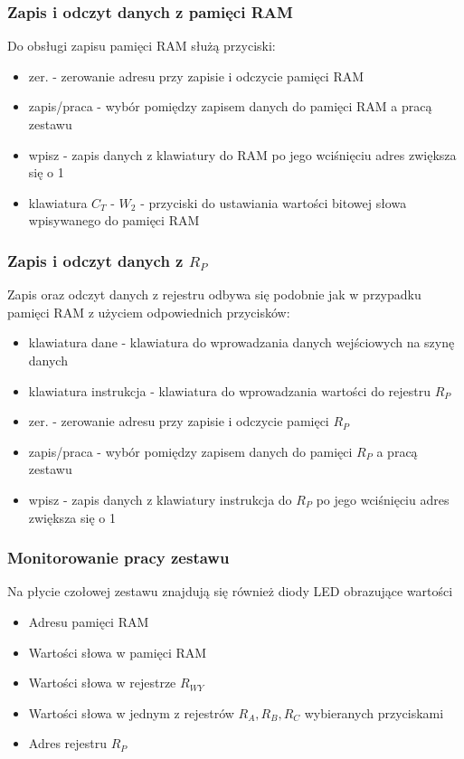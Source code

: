 \documentclass[../main.tex]{subfiles}
\begin{document}
    \subsubsection*{Zapis i odczyt danych z pamięci RAM}
    Do obsługi zapisu pamięci RAM służą przyciski:
    \begin{itemize}
        \item zer. - zerowanie adresu przy zapisie i odczycie pamięci RAM
        \item zapis/praca - wybór pomiędzy zapisem danych do pamięci RAM a pracą zestawu
        \item wpisz - zapis danych z klawiatury do RAM po jego wciśnięciu adres zwiększa się o 1
        \item klawiatura $C_T$ - $W_2$ - przyciski do ustawiania wartości bitowej słowa wpisywanego do pamięci RAM
    \end{itemize}

    \subsubsection*{Zapis i odczyt danych z $R_P$}
    Zapis oraz odczyt danych z rejestru odbywa się podobnie jak w przypadku pamięci RAM z użyciem odpowiednich przycisków:
    \begin{itemize}
        \item klawiatura dane - klawiatura do wprowadzania danych wejściowych na szynę danych
        \item klawiatura instrukcja - klawiatura do wprowadzania wartości do rejestru $R_P$
        \item zer. - zerowanie adresu przy zapisie i odczycie pamięci $R_P$
        \item zapis/praca - wybór pomiędzy zapisem danych do pamięci $R_P$ a pracą zestawu
        \item wpisz - zapis danych z klawiatury instrukcja do $R_P$ po jego wciśnięciu adres zwiększa się o 1
    \end{itemize}

    \subsubsection*{Monitorowanie pracy zestawu}
    Na płycie czołowej zestawu znajdują się również diody LED obrazujące wartości 

    \begin{itemize}
        \item Adresu pamięci RAM
        \item Wartości słowa w pamięci RAM
        \item Wartości słowa w rejestrze $R_{WY}$
        \item Wartości słowa w jednym z rejestrów $R_A, R_B, R_C$ wybieranych przyciskami
        \item Adres rejestru $R_P$
    \end{itemize}
\end{document}
